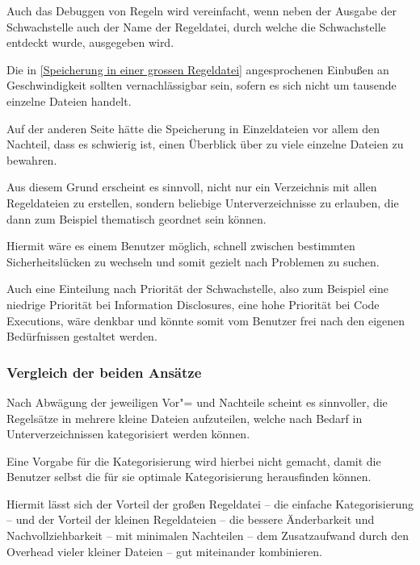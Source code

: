                 Auch das Debuggen von Regeln wird vereinfacht,
                wenn neben der Ausgabe der Schwachstelle auch der Name der Regeldatei,
                durch welche die Schwachstelle entdeckt wurde,
                ausgegeben wird.

                Die in
                \vref{Speicherung in einer grossen Regeldatei} angesprochenen Einbußen an Geschwindigkeit sollten vernachlässigbar sein,
                sofern es sich nicht um tausende einzelne Dateien handelt.

                Auf der anderen Seite hätte die Speicherung in Einzeldateien vor allem den Nachteil,
                dass es schwierig ist,
                einen Überblick über zu viele einzelne Dateien zu bewahren.

                Aus diesem Grund erscheint es sinnvoll,
                nicht nur ein Verzeichnis mit allen Regeldateien zu erstellen,
                sondern beliebige Unterverzeichnisse zu erlauben,
                die dann zum Beispiel thematisch geordnet sein können.

                Hiermit wäre es einem Benutzer möglich,
                schnell zwischen bestimmten Sicherheitslücken zu wechseln und
                somit gezielt nach Problemen zu suchen.

                Auch eine Einteilung nach Priorität der Schwachstelle,
                also zum Beispiel eine niedrige Priorität bei Information Disclosures,
                eine hohe Priorität bei Code Executions,
                wäre denkbar und
                könnte somit vom Benutzer frei nach den eigenen Bedürfnissen gestaltet werden.

            \subsubsection{Vergleich der beiden Ansätze}\label{Vergleich der beiden Ansätze}
                Nach Abwägung der jeweiligen Vor"= und
                Nachteile scheint es sinnvoller,
                die Regelsätze in mehrere kleine Dateien aufzuteilen,
                welche nach Bedarf in Unterverzeichnissen kategorisiert werden können.

                Eine Vorgabe für die Kategorisierung wird hierbei nicht gemacht,
                damit die Benutzer selbst die für sie optimale Kategorisierung herausfinden können.

                Hiermit lässt sich der Vorteil der großen Regeldatei
                -- die einfache Kategorisierung
                -- und
                der Vorteil der kleinen Regeldateien
                -- die bessere Änderbarkeit und
                Nachvollziehbarkeit
                -- mit minimalen Nachteilen
                -- dem Zusatzaufwand durch den Overhead vieler kleiner Dateien
                -- gut miteinander kombinieren.

